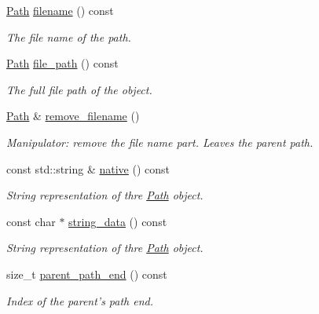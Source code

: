 \begin{DoxyCompactItemize}
\hyperlink{class_d_d4hep_1_1_path}{Path} \hyperlink{class_d_d4hep_1_1_path_af8ae8422a7922589ff46d82e222658d0}{filename} () const 
\begin{DoxyCompactList}\small\item\em The file name of the path. \item\end{DoxyCompactList}\item 
\hyperlink{class_d_d4hep_1_1_path}{Path} \hyperlink{class_d_d4hep_1_1_path_a82c9926859aafdb6b107001787f6fecb}{file\_\-path} () const 
\begin{DoxyCompactList}\small\item\em The full file path of the object. \item\end{DoxyCompactList}\item 
\hyperlink{class_d_d4hep_1_1_path}{Path} \& \hyperlink{class_d_d4hep_1_1_path_aa969a2f648dce5181c569478cd69c0be}{remove\_\-filename} ()
\begin{DoxyCompactList}\small\item\em Manipulator: remove the file name part. Leaves the parent path. \item\end{DoxyCompactList}\item 
const std::string \& \hyperlink{class_d_d4hep_1_1_path_a7d991762025ef6fe125386880be1f690}{native} () const 
\begin{DoxyCompactList}\small\item\em String representation of thre \hyperlink{class_d_d4hep_1_1_path}{Path} object. \item\end{DoxyCompactList}\item 
const char $\ast$ \hyperlink{class_d_d4hep_1_1_path_aac27606d4acb5641d6a5b3e4a4c2f3bb}{string\_\-data} () const 
\begin{DoxyCompactList}\small\item\em String representation of thre \hyperlink{class_d_d4hep_1_1_path}{Path} object. \item\end{DoxyCompactList}\item 
size\_\-t \hyperlink{class_d_d4hep_1_1_path_a5f107fe34944be1f0ee85b0e886232b7}{parent\_\-path\_\-end} () const 
\begin{DoxyCompactList}\small\item\em Index of the parent's path end. \item\end{DoxyCompactList}\end{DoxyCompactItemize}


